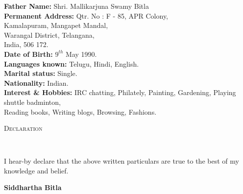 \documentclass[9pt]{article}
\newenvironment{changemargin}[2]{%
  \begin{list}{}{%
    \setlength{\topsep}{0pt}%
    \setlength{\leftmargin}{#1}%
    \setlength{\rightmargin}{#2}%
    \setlength{\listparindent}{\parindent}%
    \setlength{\itemindent}{\parindent}%
    \setlength{\parsep}{\parskip}%
  }%
  \item[]}{\end{list}
}
\newcommand{\lineover}{
	\begin{changemargin}{-0.05in}{-0.05in}
		\vspace*{-8pt}
		\hrulefill \\
		\vspace*{-2pt}
	\end{changemargin}
}
\newcommand{\header}[1]{
	\begin{changemargin}{-0.5in}{-0.5in}
		\scshape{#1}\\
  	\lineover
	\end{changemargin}
}
\newenvironment{body} {
	\vspace*{-16pt}
	\begin{changemargin}{-0.25in}{-0.5in}
  }	
	{\end{changemargin}
}
\begin{document}
\begin{body}
	\vspace{14pt}
	
\textbf{Father Name:}{} \hfill Shri. Mallikarjuna Swamy Bitla{} \\
\medskip
\textbf{Permanent Address:}{} \hfill Qtr. No : F - 85, APR Colony,{}\\
	\hfill Kamalapuram, Mangapet Mandal,{}\\
	\hfill Warangal District, Telangana,{}\\
	\hfill India, 506 172.{}\\
\medskip
\textbf{Date of Birth:}{} \hfill $9^{th}$ May 1990.{}\\
\medskip
\textbf{Languages known:}{} \hfill Telugu, Hindi, English.{}\\
\medskip
\textbf{Marital status:}{} \hfill Single.{}\\
\medskip
\textbf{Nationality:}{} \hfill Indian.{}\\
\medskip
\textbf{Interest \& Hobbies:}{} \hfill IRC chatting, Philately, Painting, Gardening, Playing shuttle badminton,{}\\ \hfill Reading books, Writing blogs, Browsing, Fashions.{}

\end{body}
\smallskip


\header{Declaration}

\begin{body}
	\vspace{14pt}
 I hear-by declare that the above written particulars are true to the best of my knowledge and belief.
\medskip
\medskip
\medskip
\begin{flushright}
\textbf{Siddhartha Bitla}
\end{flushright}
\end{body}
\end{document}

